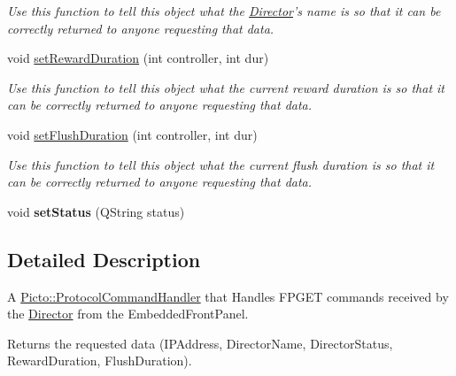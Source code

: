 \begin{DoxyCompactItemize}
\begin{DoxyCompactList}\small\item\em Use this function to tell this object what the \hyperlink{class_director}{Director}'s name is so that it can be correctly returned to anyone requesting that data. \end{DoxyCompactList}\item 
\hypertarget{struct_f_p_g_e_t_command_handler_a0bbaa02b29e405b6d5d33cc77bed3536}{void \hyperlink{struct_f_p_g_e_t_command_handler_a0bbaa02b29e405b6d5d33cc77bed3536}{set\-Reward\-Duration} (int controller, int dur)}\label{struct_f_p_g_e_t_command_handler_a0bbaa02b29e405b6d5d33cc77bed3536}

\begin{DoxyCompactList}\small\item\em Use this function to tell this object what the current reward duration is so that it can be correctly returned to anyone requesting that data. \end{DoxyCompactList}\item 
\hypertarget{struct_f_p_g_e_t_command_handler_a3a618bf41f585a8a6f2f2df69916be4a}{void \hyperlink{struct_f_p_g_e_t_command_handler_a3a618bf41f585a8a6f2f2df69916be4a}{set\-Flush\-Duration} (int controller, int dur)}\label{struct_f_p_g_e_t_command_handler_a3a618bf41f585a8a6f2f2df69916be4a}

\begin{DoxyCompactList}\small\item\em Use this function to tell this object what the current flush duration is so that it can be correctly returned to anyone requesting that data. \end{DoxyCompactList}\item 
\hypertarget{struct_f_p_g_e_t_command_handler_a3a091ffe3ec0ab19bbc44e9042aa481f}{void {\bfseries set\-Status} (Q\-String status)}\label{struct_f_p_g_e_t_command_handler_a3a091ffe3ec0ab19bbc44e9042aa481f}

\end{DoxyCompactItemize}


\subsection{Detailed Description}
A \hyperlink{struct_picto_1_1_protocol_command_handler}{Picto\-::\-Protocol\-Command\-Handler} that Handles F\-P\-G\-E\-T commands received by the \hyperlink{class_director}{Director} from the Embedded\-Front\-Panel. 

Returns the requested data (I\-P\-Address, Director\-Name, Director\-Status, Reward\-Duration, Flush\-Duration).

